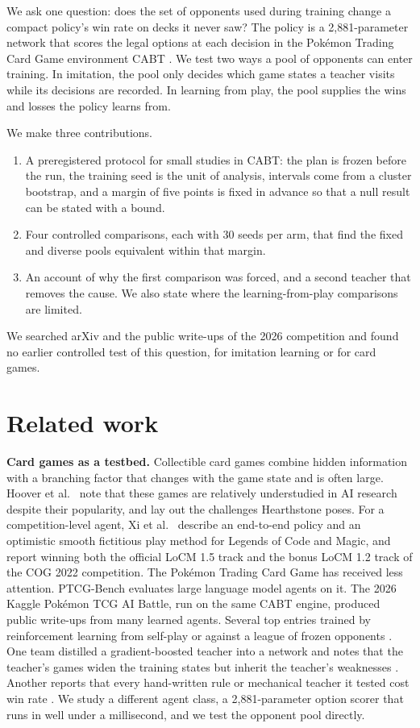 \documentclass[conference]{IEEEtran}
\begin{document}
We ask one question: does the set of opponents used during training change a compact policy's win rate on decks it never saw? The policy is a 2,881-parameter network that scores the legal options at each decision in the Pok\'emon Trading Card Game environment CABT \cite{cabt}. We test two ways a pool of opponents can enter training. In imitation, the pool only decides which game states a teacher visits while its decisions are recorded. In learning from play, the pool supplies the wins and losses the policy learns from.

We make three contributions.
\begin{enumerate}
  \item A preregistered protocol for small studies in CABT: the plan is frozen before the run, the training seed is the unit of analysis, intervals come from a cluster bootstrap, and a margin of five points is fixed in advance so that a null result can be stated with a bound.
  \item Four controlled comparisons, each with 30 seeds per arm, that find the fixed and diverse pools equivalent within that margin.
  \item An account of why the first comparison was forced, and a second teacher that removes the cause. We also state where the learning-from-play comparisons are limited.
\end{enumerate}
We searched arXiv and the public write-ups of the 2026 competition and found no earlier controlled test of this question, for imitation learning or for card games.

\section{Related work}

\textbf{Card games as a testbed.} Collectible card games combine hidden information with a branching factor that changes with the game state and is often large. Hoover et al.\ \cite{Hoover19} note that these games are relatively understudied in AI research despite their popularity, and lay out the challenges Hearthstone poses. For a competition-level agent, Xi et al.\ \cite{Xi23} describe an end-to-end policy and an optimistic smooth fictitious play method for Legends of Code and Magic, and report winning both the official LoCM 1.5 track and the bonus LoCM 1.2 track of the COG 2022 competition. The Pok\'emon Trading Card Game has received less attention. PTCG-Bench \cite{Hua26} evaluates large language model agents on it. The 2026 Kaggle Pok\'emon TCG AI Battle, run on the same CABT engine, produced public write-ups from many learned agents. Several top entries trained by reinforcement learning from self-play or against a league of frozen opponents \cite{Kaggle7th,Kaggle6th}. One team distilled a gradient-boosted teacher into a network and notes that the teacher's games widen the training states but inherit the teacher's weaknesses \cite{Kaggle24th}. Another reports that every hand-written rule or mechanical teacher it tested cost win rate \cite{Kaggle7th}. We study a different agent class, a 2,881-parameter option scorer that runs in well under a millisecond, and we test the opponent pool directly.
\end{document}
